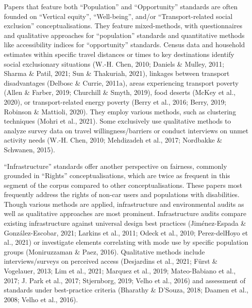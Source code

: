 \documentclass[
  letterpaper,
  DIV=11,
  numbers=noendperiod]{scrartcl}
\begin{document}
Papers that feature both ``Population'' and ``Opportunity'' standards
are often founded on ``Vertical equity'', ``Well-being'', and/or
``Transport-related social exclusion'' conceptualisations. They feature
mixed-methods, with questionnaires and qualitative approaches for
``population'' standards and quantitative methods like accessibility
indices for ``opportunity'' standards. Census data and household
estimates within specific travel distances or times to key destinations
identify social exclusionary situations (W.-H. Chen, 2010; Daniels \&
Mulley, 2011; Sharma \& Patil, 2021; Sun \& Thakuriah, 2021), linkages
between transport disadvantages (Delbosc \& Currie, 2011a), areas
experiencing transport poverty (Allen \& Farber, 2019; Churchill \&
Smyth, 2019), food deserts (McKey et al., 2020), or transport-related
energy poverty (Berry et al., 2016; Berry, 2019; Robinson \& Mattioli,
2020). They employ various methods, such as clustering techniques (Mohri
et al., 2021). Some exclusively use qualitative methods to analyze
survey data on travel willingness/barriers or conduct interviews on
unmet activity needs (W.-H. Chen, 2010; Mehdizadeh et al., 2017;
Nordbakke \& Schwanen, 2015).

``Infrastructure'' standards offer another perspective on fairness,
commonly grounded in ``Rights'' conceptualisations, which are twice as
frequent in this segment of the corpus compared to other
conceptualisations. These papers most frequently address the rights of
non-car users and populations with disabilities. Though various methods
are applied, infrastructure and environmental audits as well as
qualitative approaches are most prominent. Infrastructure audits compare
existing infrastructure against universal design best practices
(Jiménez-Espada \& González-Escobar, 2021; Larkins et al., 2011; Odeck
et al., 2010; Perez-delHoyo et al., 2021) or investigate elements
correlating with mode use by specific population groups (Moniruzzaman \&
Paez, 2016). Qualitative methods include interviews/surveys on perceived
access (Desjardins et al., 2021; Fürst \& Vogelauer, 2013; Lim et al.,
2021; Marquez et al., 2019; Mateo-Babiano et al., 2017; J. Park et al.,
2017; Stjernborg, 2019; Velho et al., 2016) and assessment of standards
under best-practice criteria (Bharathy \& D'Souza, 2018; Daamen et al.,
2008; Velho et al., 2016).
\end{document}
